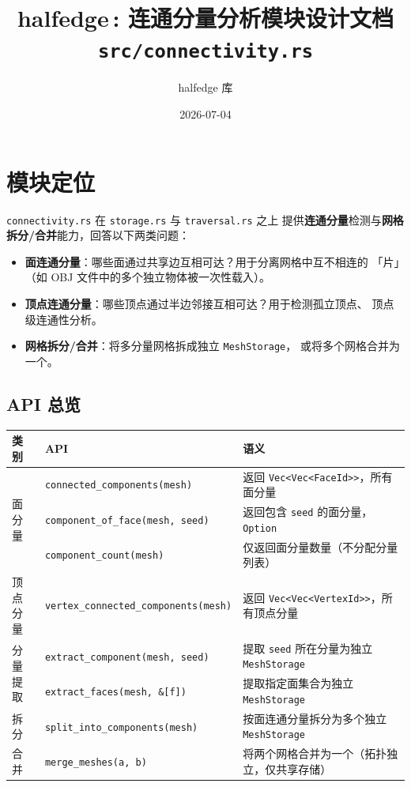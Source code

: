 \documentclass[11pt,a4paper]{article}
\title{\textbf{halfedge\,: 连通分量分析模块设计文档} \\ \large \texttt{src/connectivity.rs}}
\author{halfedge 库}
\date{2026-07-04}
\begin{document}
\maketitle
\tableofcontents

\section{模块定位}

\texttt{connectivity.rs} 在 \texttt{storage.rs} 与 \texttt{traversal.rs} 之上
提供\textbf{连通分量}检测与\textbf{网格拆分/合并}能力，回答以下两类问题：

\begin{itemize}
  \item \textbf{面连通分量}：哪些面通过共享边互相可达？用于分离网格中互不相连的
        「片」（如 OBJ 文件中的多个独立物体被一次性载入）。
  \item \textbf{顶点连通分量}：哪些顶点通过半边邻接互相可达？用于检测孤立顶点、
        顶点级连通性分析。
  \item \textbf{网格拆分/合并}：将多分量网格拆成独立 \texttt{MeshStorage}，
        或将多个网格合并为一个。
\end{itemize}

\subsection{API 总览}

\begin{center}
\renewcommand{\arraystretch}{1.18}
\begin{tabular}{@{}lll@{}}
  \toprule
  \textbf{类别} & \textbf{API} & \textbf{语义} \\
  \midrule
  \multirow{3}{*}{面分量}
    & \texttt{connected\_components(mesh)}        & 返回 \texttt{Vec<Vec<FaceId>>}，所有面分量 \\
    & \texttt{component\_of\_face(mesh, seed)}    & 返回包含 \texttt{seed} 的面分量，\texttt{Option} \\
    & \texttt{component\_count(mesh)}             & 仅返回面分量数量（不分配分量列表） \\
  \midrule
  顶点分量
    & \texttt{vertex\_connected\_components(mesh)} & 返回 \texttt{Vec<Vec<VertexId>>}，所有顶点分量 \\
  \midrule
  \multirow{2}{*}{分量提取}
    & \texttt{extract\_component(mesh, seed)}     & 提取 \texttt{seed} 所在分量为独立 \texttt{MeshStorage} \\
    & \texttt{extract\_faces(mesh, \&[f])}        & 提取指定面集合为独立 \texttt{MeshStorage} \\
  \midrule
  拆分
    & \texttt{split\_into\_components(mesh)}      & 按面连通分量拆分为多个独立 \texttt{MeshStorage} \\
  \midrule
  合并
    & \texttt{merge\_meshes(a, b)}                & 将两个网格合并为一个（拓扑独立，仅共享存储） \\
  \bottomrule
\end{tabular}
\end{center}
\end{document}

